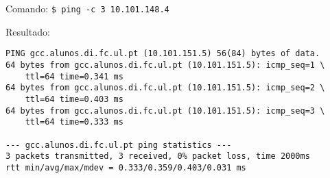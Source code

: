 \documentclass[12pt, a4paper, twoside]{report} %
\begin{document}
\noindent Comando: \texttt{\$ ping -c 3 10.101.148.4}

\noindent Resultado:

\begin{lstlisting}
PING gcc.alunos.di.fc.ul.pt (10.101.151.5) 56(84) bytes of data.
64 bytes from gcc.alunos.di.fc.ul.pt (10.101.151.5): icmp_seq=1 \
	ttl=64 time=0.341 ms
64 bytes from gcc.alunos.di.fc.ul.pt (10.101.151.5): icmp_seq=2 \
	ttl=64 time=0.403 ms
64 bytes from gcc.alunos.di.fc.ul.pt (10.101.151.5): icmp_seq=3 \
	ttl=64 time=0.333 ms

--- gcc.alunos.di.fc.ul.pt ping statistics ---
3 packets transmitted, 3 received, 0% packet loss, time 2000ms
rtt min/avg/max/mdev = 0.333/0.359/0.403/0.031 ms
\end{lstlisting}
\end{document}
